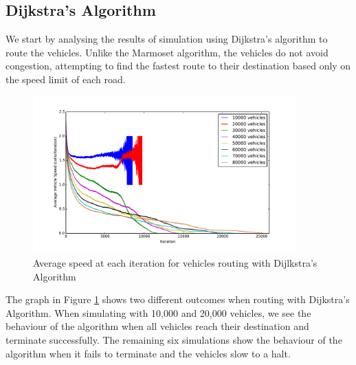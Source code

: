 \documentclass[ %
                    author={Alexander Hill},
                supervisor={Dr. Benjamin Sach},
                    degree={MEng},
                     title={MARMOSET},
                  subtitle={Multi-Agent Route Management using Online Simulation for Efficient Transportation},
                      type={research},
                      year={2016} ]{dissertation}
\begin{document}
\subsection{Dijkstra's Algorithm}\label{sec:density}

We start by analysing the results of simulation using Dijkstra's algorithm to
route the vehicles. Unlike the Marmoset algorithm, the vehicles do not avoid
congestion, attempting to find the fastest route to their destination based only
on the speed limit of each road.

\begin{figure}[h]
    \centering
    \includegraphics[width=0.9\textwidth]{dijkstra-speed}
    \caption{Average speed at each iteration for vehicles routing with
    Dijlkstra's Algorithm}\label{fig:dijkstra-speed}
\end{figure}

The graph in Figure \ref{fig:dijkstra-speed} shows two different outcomes when
routing with Dijkstra's Algorithm. When simulating with 10,000 and 20,000
vehicles, we see the behaviour of the algorithm when all vehicles reach their
destination and terminate successfully. The remaining six simulations show the
behaviour of the algorithm when it fails to terminate and the vehicles slow to a
halt.
\end{document}

